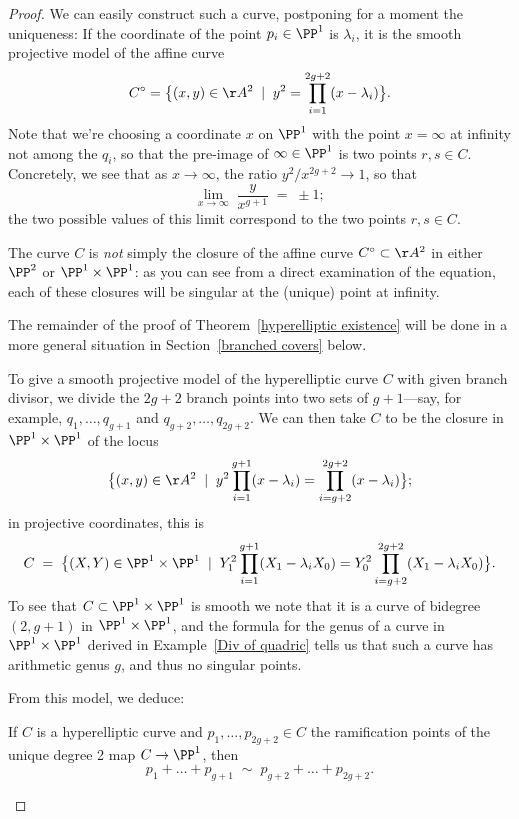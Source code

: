 \begin{proof} 
We can easily construct such a curve, postponing for a moment the uniqueness:
If the coordinate of the point $p_i \in \PP^1$ is $\lambda_i$, it is the smooth projective model of the affine curve 
  $$
C^\circ = \big\{ (x,y) \in \AA^2 \; \mid \; y^2 = \prod_{i=1}^{2g+2} (x - \lambda_i) \big\}.
$$ 
Note that we're choosing a coordinate $x$ on $\PP^1$ with the point $x = \infty$ at infinity not among the $q_i$, so that the pre-image of $\infty \in \PP^1$ is two points $r, s \in C$. Concretely, we see that as $x \to \infty$, the ratio $y^2/x^{2g+2} \to 1$, so that 
$$
\lim_{x \to \infty} \; \frac{y}{x^{g+1}} \; = \; \pm 1;
$$
  the two possible values of this limit correspond to the two points $r,s \in C$.
  
The curve $C$ is \emph{not} simply the closure of the affine curve $C^\circ \subset \AA^2$ in either $\PP^2$ or $\PP^1 \times \PP^1$: as you can see from a direct examination of the equation, each of these closures will be singular at the (unique) point at infinity.
  
   The remainder of the proof of Theorem~\ref{hyperelliptic existence} will be done in a more general situation in Section~\ref{branched covers} below.
  
To give a smooth projective model of the hyperelliptic curve $C$ with given branch divisor, we divide the $2g+2$ branch points  into two sets of $g+1$---say, for example, $q_1,\dots,q_{g+1}$ and $q_{g+2}, \dots, q_{2g+2}$. We can then take $C$ to be the closure in $\PP^1 \times \PP^1$ of the  locus
  $$
  \big\{ (x,y) \in \AA^2 \; \mid \; y^2\prod_{i=1}^{g+1} (x - \lambda_i) = \prod_{i=g+2}^{2g+2} (x - \lambda_i) \big\};
  $$
  in projective coordinates, this is
   $$
  C \; = \; \big\{ (X,Y) \in \PP^1 \times \PP^1 \; \mid \; Y_1^2\prod_{i=1}^{g+1} (X_1 - \lambda_iX_0) = Y_0^2\prod_{i=g+2}^{2g+2} (X_1 - \lambda_iX_0) \big\}.
  $$
To see that $C \subset \PP^1 \times \PP^1$ is smooth we note that it is a curve of bidegree $(2,g+1)$ in $\PP^1 \times \PP^1$, and the formula for the genus of a curve in $\PP^1 \times \PP^1$ derived in Example~\ref{Div of quadric} tells us that such a curve has arithmetic genus $g$, and thus no singular points.

From this model, we deduce:

\begin{corollary}\label{relation on ramification points}
If $C$ is a hyperelliptic curve  and $p_1,\dots,p_{2g+2} \in C$ the ramification points of the unique degree 2 map $C \to \PP^1$, then 
$$
p_1+\dots + p_{g+1} \; \sim \; p_{g+2} + \dots + p_{2g+2}.
$$
\end{corollary}
  

\end{proof}
